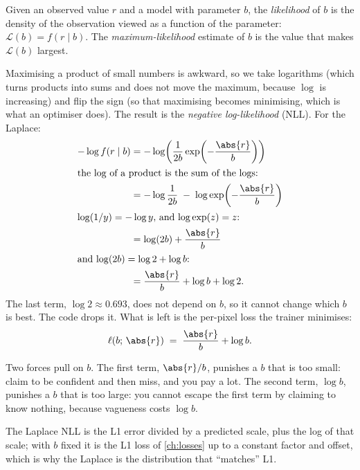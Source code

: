 \begin{definition}[Likelihood]
Given an observed value $r$ and a model with parameter $b$, the \emph{likelihood} of $b$ is
the density of the observation viewed as a function of the parameter: $\mathcal{L}(b)=f(r\mid b)$. The
\emph{maximum-likelihood} estimate of $b$ is the value that makes $\mathcal{L}(b)$
largest.
\end{definition}

Maximising a product of small numbers is awkward, so we take logarithms (which turns products into sums and
does not move the maximum, because $\log$ is increasing) and flip the sign (so that maximising becomes
minimising, which is what an optimiser does). The result is the \emph{negative log-likelihood} (NLL). For the Laplace:
\begin{align}
-\log f(r\mid b) &= -\log\!\left(\frac{1}{2b}\exp\!\left(-\frac{\abs{r}}{b}\right)\right)
  \nonumber\\
  \intertext{the log of a product is the sum of the logs:}
  &= -\log\frac{1}{2b} \;-\; \log\exp\!\left(-\frac{\abs{r}}{b}\right) \nonumber\\
  \intertext{$\log(1/y)=-\log y$, and $\log\exp(z)=z$:}
  &= \log(2b) + \frac{\abs{r}}{b} \nonumber\\
  \intertext{and $\log(2b)=\log 2+\log b$:}
  &= \frac{\abs{r}}{b} + \log b + \log 2. \label{eq:uncertainty:nll}
\end{align}
The last term, $\log 2\approx 0.693$, does not depend on $b$, so it cannot change which $b$ is best. The code
drops it. What is left is the per-pixel loss the trainer minimises:
\begin{equation}\label{eq:uncertainty:loss}
  \ell(b;\,\abs{r}) \;=\; \frac{\abs{r}}{b} + \log b .
\end{equation}

Two forces pull on $b$. The first term, $\abs{r}/b$, punishes a $b$ that is too small: claim to be confident
and then miss, and you pay a lot. The second term, $\log b$, punishes a $b$ that is too large: you cannot
escape the first term by claiming to know nothing, because vagueness costs $\log b$.

\begin{keypoint}
The Laplace NLL is the L1 error divided by a predicted scale, plus the log of that scale; with $b$ fixed it is
the L1 loss of \cref{ch:losses} up to a constant factor and offset, which is why the Laplace is the
distribution that ``matches'' L1.
\end{keypoint}

